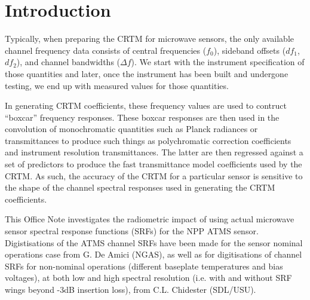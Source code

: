 \section{Introduction}

Typically, when preparing the CRTM for microwave sensors, the only available channel frequency data consists of central frequencies ($f_0$), sideband offsets ($df_1$,$df_2$), and channel bandwidths ($\Delta f$). We start with the instrument specification of those quantities and later, once the instrument has been built and undergone testing, we end up with measured values for those quantities.

In generating CRTM coefficients, these frequency values are used to contruct ``boxcar'' frequency responses. These boxcar responses are then used in the convolution of monochromatic quantities such as Planck radiances or transmittances to produce such things as polychromatic correction coefficients and instrument resolution transmittances. The latter are then regressed against a set of predictors to produce the fast transmittance model coefficients used by the CRTM. As such, the accuracy of the CRTM for a particular sensor is sensitive to the shape of the channel spectral responses used in generating the CRTM coefficients.

This Office Note investigates the radiometric impact of using actual microwave sensor spectral response functions (SRFs) for the NPP ATMS sensor. Digistisations of the ATMS channel SRFs have been made for the sensor nominal operations case from G. De Amici (NGAS), as well as for digitisations of channel SRFs for non-nominal operations (different baseplate temperatures and bias voltages), at both low and high spectral resolution (i.e. with and without SRF wings beyond -3dB insertion loss), from C.L. Chidester (SDL/USU).

